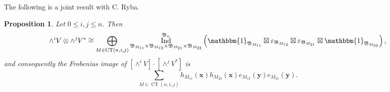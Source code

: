 \documentclass[12pt]{amsart}
\theoremstyle{plain}
\newtheorem{proposition}[theorem]{Proposition}
\theoremstyle{definition}
\DeclareMathOperator{\Ind}{Ind}
\DeclareMathOperator{\CT}{CT}
\newcommand{\x}{\mathbf{x}}
\newcommand{\y}{\mathbf{y}}
\begin{document}
The following is a joint result with C. Ryba.

\begin{proposition}\label{prop:typeB-wedges}
Let $0 \leq i,j \leq n$. Then
\begin{equation}\label{eq:mackey-module}
    \wedge^i V \otimes \wedge^j V^* \cong \bigoplus_{M \in \CT(n,i,j)} \Ind_{\mathfrak{B}_{M_{11}} \times \mathfrak{B}_{M_{12}} \times \mathfrak{B}_{M_{21}} \times \mathfrak{B}_{M_{22}}}^{\mathfrak{B}_n}\left(\mathbbm{1}_{\mathfrak{B}_{M_{11}}} \boxtimes \varepsilon_{\mathfrak{B}_{M_{12}}} \boxtimes \varepsilon_{\mathfrak{B}_{M_{21}}} \boxtimes \mathbbm{1}_{\mathfrak{B}_{M_{22}}}\right),
\end{equation}
and consequently the Frobenius image of $[\wedge^i V] \cdot [\wedge^j V^*]$ is
\begin{equation}\label{eq:mackey-two-wedges}
    \sum_{M \in \CT(n,i,j)} h_{M_{11}}(\x)h_{M_{22}}(\x) e_{M_{12}}(\y) e_{M_{21}}(\y).
\end{equation}
\end{proposition}
\end{document}
